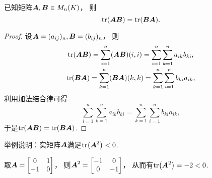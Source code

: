 \begin{property}\label{theorem:矩阵的迹.矩阵乘积交换次序不变迹}
已知矩阵\(\boldsymbol{A},\boldsymbol{B} \in M_n(K)\)，
则\begin{equation}
	\tr(\boldsymbol{A} \boldsymbol{B}) = \tr(\boldsymbol{B} \boldsymbol{A}).
\end{equation}
\begin{proof}
设\(\boldsymbol{A} = (a_{ij})_n,
\boldsymbol{B} = (b_{ij})_n\)，
则\begin{gather*}
	\tr(\boldsymbol{A} \boldsymbol{B})
	= \sum_{i=1}^n (\boldsymbol{A} \boldsymbol{B})(i,i)
	= \sum_{i=1}^n \sum_{k=1}^n a_{ik} b_{ki}, \\
	\tr(\boldsymbol{B} \boldsymbol{A})
	= \sum_{k=1}^n (\boldsymbol{B} \boldsymbol{A})(k,k)
	= \sum_{k=1}^n \sum_{i=1}^n b_{ki} a_{ik},
\end{gather*}
利用加法结合律可得\begin{equation*}
	\sum_{i=1}^n \sum_{k=1}^n a_{ik} b_{ki}
	= \sum_{k=1}^n \sum_{i=1}^n b_{ki} a_{ik},
\end{equation*}
于是\(\tr(\boldsymbol{A} \boldsymbol{B}) = \tr(\boldsymbol{B} \boldsymbol{A})\).
\end{proof}
\end{property}

\begin{example}
举例说明：实矩阵\(\boldsymbol{A}\)满足\(\tr(\boldsymbol{A}^2)<0\).
\begin{solution}
取\(\boldsymbol{A} = \begin{bmatrix}
	0 & 1 \\
	-1 & 0
\end{bmatrix}\)，
则\(\boldsymbol{A}^2 = \begin{bmatrix}
	-1 & 0 \\
	0 & -1
\end{bmatrix}\)，
从而有\(\tr(\boldsymbol{A}^2) = -2 < 0\).
\end{solution}
\end{example}

